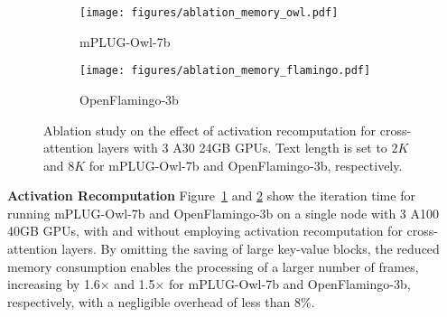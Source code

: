 \begin{figure}[t]
    \centering
    \begin{subfigure}[b]{\linewidth}
        \centering
        \texttt{[image: figures/ablation\_memory\_owl.pdf]}
        \caption{mPLUG-Owl-7b}
        \label{fig:ablation_mem_owl}
    \end{subfigure}
    \begin{subfigure}[b]{\linewidth}
        \centering
        \texttt{[image: figures/ablation\_memory\_flamingo.pdf]}
        \caption{OpenFlamingo-3b}
        \label{fig:ablation_mem_flamingo}
    \end{subfigure}
    \caption{Ablation study on the effect of activation recomputation for cross-attention layers with 3 A30 24GB GPUs. Text length is set to $2K$ and $8K$ for mPLUG-Owl-7b and OpenFlamingo-3b, respectively.}
    \label{fig:ablation_mem}
    \vspace{-3ex}
\end{figure}
\textbf{Activation Recomputation} Figure~\ref{fig:ablation_mem_owl} and \ref{fig:ablation_mem_flamingo} show the iteration time for running mPLUG-Owl-7b and OpenFlamingo-3b on a single node with 3 A100 40GB GPUs, with and without employing activation recomputation for cross-attention layers. By omitting the saving of large key-value blocks, the reduced memory consumption enables the processing of a larger number of frames, increasing by 1.6$\times$ and 1.5$\times$ for mPLUG-Owl-7b and OpenFlamingo-3b, respectively, with a negligible overhead of less than 8\%.





